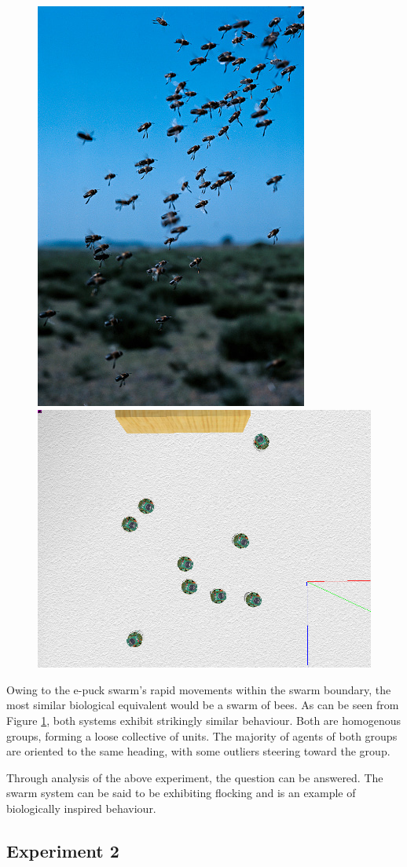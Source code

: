 \begin{figure}[h]
	\includegraphics[width=.355\linewidth]{bee-swarm}
	\includegraphics[width=.5\linewidth]{epuck-bees}
	\label{fig:bees}
\end{figure}

Owing to the e-puck swarm's rapid movements within the swarm boundary, the most similar biological equivalent would be a swarm of bees. As can be seen from Figure \ref{fig:bees}, both systems exhibit strikingly similar behaviour. Both are homogenous groups, forming a loose collective of units. The majority of agents of both groups are oriented to the same heading, with some outliers steering toward the group. 

Through analysis of the above experiment, the question can be answered. The swarm system can be said to be exhibiting flocking and is an example of biologically inspired behaviour.
\clearpage
\subsection{Experiment 2}

